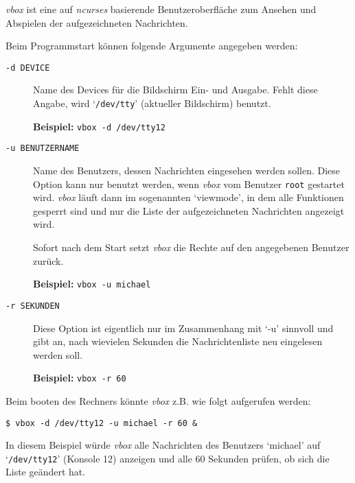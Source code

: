 {\em vbox\/} ist eine auf {\em ncurses\/} basierende Benutzeroberfl\"{a}che
zum Ansehen und Abspielen der aufgezeichneten Nachrichten.

Beim Programmstart k\"{o}nnen folgende Argumente angegeben werden:

\begin{description}


\item[{\tt -d DEVICE}] \mbox{}



Name des Devices f\"{u}r die Bildschirm Ein- und Ausgabe. Fehlt diese Angabe,
wird `{\tt /dev/tty}' (aktueller Bildschirm) benutzt.

{\bf Beispiel:} {\tt vbox -d /dev/tty12}



\item[{\tt -u BENUTZERNAME}] \mbox{}



Name des Benutzers, dessen Nachrichten eingesehen werden sollen. Diese
Option kann nur benutzt werden, wenn {\em vbox\/} vom Benutzer
{\tt root} gestartet wird. {\em vbox\/} l\"{a}uft dann im sogenannten
`viewmode', in dem alle Funktionen gesperrt sind und nur die Liste der
aufgezeichneten Nachrichten angezeigt wird.

Sofort nach dem Start setzt {\em vbox\/} die Rechte auf den angegebenen
Benutzer zur\"{u}ck.

{\bf Beispiel:} {\tt vbox -u michael}



\item[{\tt -r SEKUNDEN}] \mbox{}



Diese Option ist eigentlich nur im Zusammenhang mit `-u' sinnvoll und
gibt an, nach wievielen Sekunden die Nachrichtenliste neu eingelesen
werden soll.

{\bf Beispiel:} {\tt vbox -r 60}



\end{description}


Beim booten des Rechners k\"{o}nnte {\em vbox\/} z.B. wie folgt aufgerufen
werden:

{\tt \$ vbox -d /dev/tty12 -u michael -r 60 \&}

In diesem Beispiel w\"{u}rde {\em vbox\/} alle Nachrichten des Benutzers
`michael' auf `{\tt /dev/tty12}' (Konsole 12) anzeigen und alle 60
Sekunden pr\"{u}fen, ob sich die Liste ge\"{a}ndert hat.

